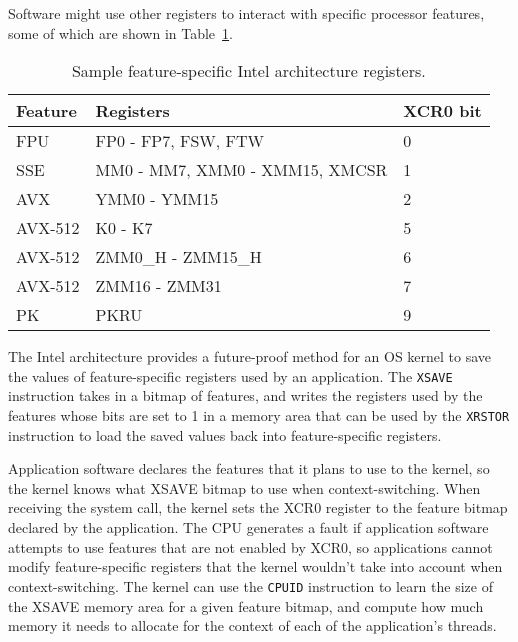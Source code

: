 
Software might use other registers to interact with specific processor
features, some of which are shown in Table~\ref{fig:xsave_state}.

\begin{table}[hbt]
  \centering
  \begin{tabularx}{\columnwidth}{| l | X | l |}
  \hline
  \textbf{Feature} & \textbf{Registers} & \textbf{XCR0 bit}\\
  \hline
  FPU & FP0 - FP7, FSW, FTW & 0 \\
  \hline
  SSE & MM0 - MM7, XMM0 - XMM15, XMCSR & 1 \\
  \hline
  AVX & YMM0 - YMM15 & 2 \\
  \hline
  AVX-512 & K0 - K7 & 5 \\
  \hline
  AVX-512 & ZMM0\_H  - ZMM15\_H & 6 \\
  \hline
  AVX-512 & ZMM16 - ZMM31 & 7 \\
  \hline
  PK & PKRU & 9 \\
  \hline
  \end{tabularx}
  \caption{Sample feature-specific Intel architecture registers.}
  \label{fig:xsave_state}
\end{table}

The Intel architecture provides a future-proof method for an OS kernel to save
the values of feature-specific registers used by an application. The
\texttt{XSAVE} instruction takes in a bitmap of features, and writes the
registers used by the features whose bits are set to 1 in a memory area that
can be used by the \texttt{XRSTOR} instruction to load the saved values back
into feature-specific registers.

Application software declares the features that it plans to use to the kernel,
so the kernel knows what XSAVE bitmap to use when context-switching. When
receiving the system call, the kernel sets the XCR0 register to the feature
bitmap declared by the application. The CPU generates a fault if application
software attempts to use features that are not enabled by XCR0, so applications
cannot modify feature-specific registers that the kernel wouldn't take into
account when context-switching. The kernel can use the \texttt{CPUID}
instruction to learn the size of the XSAVE memory area for a given feature
bitmap, and compute how much memory it needs to allocate for the context of
each of the application's threads.
